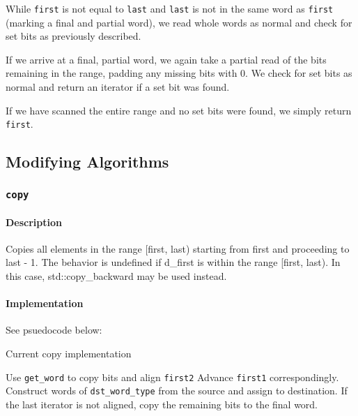 \documentclass[letterpaper, 8pt, twocolumn]{article}
\begin{document}
While \texttt{first} is not equal to \texttt{last} and \texttt{last} is not in the same word as \texttt{first} (marking a final and partial word), we read whole words as normal and check for set bits as previously described.

If we arrive at a final, partial word, we again take a partial read of the bits remaining in the range, padding any missing bits with 0. We check for set bits as normal and return an iterator if a set bit was found.

If we have scanned the entire range and no set bits were found, we simply return \texttt{first}.

\subsection{Modifying Algorithms}
\label{subsec:modifyingAlgs}

\subsubsection{\texttt{copy}}
\label{subsubsec:copy}
\paragraph{Description}
Copies all elements in the range [first, last) starting from first and 
proceeding to last - 1. The behavior is undefined if d\_first is within the 
range [first, last). In this case, std::copy\_backward may be used instead.

\paragraph{Implementation}
See psuedocode below:
\begin{algorithm}[H]
    \caption{Current copy implementation}
    \begin{algorithmic}[1]
            \State Use \texttt{get\_word} to copy bits and align \texttt{first2}
            \State Advance \texttt{first1} correspondingly.
        \EndIf
            \State Construct words of \texttt{dst\_word\_type}
            from the source and assign to destination.
        \EndWhile
        \State If the last iterator is not aligned, copy the remaining bits to the
            final word.
        \EndFunction
    \end{algorithmic}
\end{algorithm}
\end{document}
